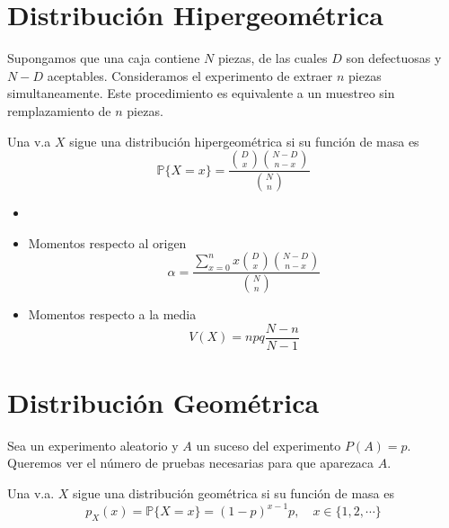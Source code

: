\section{Distribución Hipergeométrica}

Supongamos que una caja contiene $N$ piezas, de las cuales $D$ son defectuosas y $N - D$ aceptables. Consideramos el experimento de extraer $n$ piezas simultaneamente. Este procedimiento es equivalente a un muestreo sin remplazamiento de $n$ piezas.

\begin{defn}
  Una v.a $X$ sigue una distribución hipergeométrica si su función de masa es
  \[ 
    \mathbb{P} \{ X = x \} = \frac{\binom{D}{x} \binom{N - D}{n - x}}{\binom{N}{n}} 
  \] 
\end{defn}

\begin{prop}
  \begin{itemize}
    \item []
    \item Momentos respecto al origen
      \[ 
        \alpha = \frac{ \sum_{x = 0}^{n}  x \binom{D}{x} \binom{N - D}{n - x}}{\binom{N}{n}} 
      \] 
    \item Momentos respecto a la media
      \[ 
        V(X) = npq \frac{N - n}{N - 1} 
      \] 
  \end{itemize}
\end{prop}

\section{Distribución Geométrica}

Sea un experimento aleatorio y $A$ un suceso del experimento $P(A) = p$. Queremos ver el número de pruebas necesarias para que aparezaca $A$.

\begin{defn}
  Una v.a. $X$ sigue una distribución geométrica si su función de masa es
  \[ 
    p_{X}(x) = \mathbb{P} \{ X = x \} = (1 - p)^{x -1} p, \quad x \in \{ 1, 2, \cdots \}
  \] 
\end{defn}

